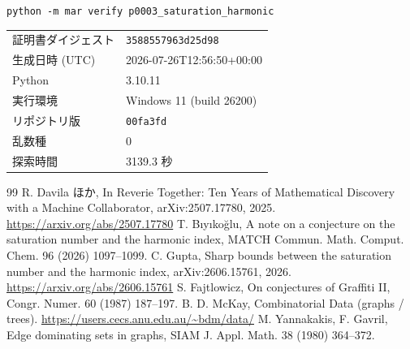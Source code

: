 \documentclass[paper=a4,fontsize=10.5pt,jafontsize=10.5pt]{jlreq}
\theoremstyle{plain}
\theoremstyle{definition}
\begin{document}
\begin{center}\texttt{python -m mar verify p0003\_saturation\_harmonic}\end{center}

\begin{center}\begin{tabular}{ll}\toprule
証明書ダイジェスト & \texttt{3588557963d25d98} \\
生成日時 (UTC) & 2026-07-26T12:56:50+00:00 \\
Python & 3.10.11 \\
実行環境 & Windows 11 (build 26200) \\
リポジトリ版 & \texttt{00fa3fd} \\
乱数種 & 0 \\
探索時間 & 3139.3 秒 \\
\bottomrule\end{tabular}\end{center}


\begin{thebibliography}{99}
 R. Davila ほか, In Reverie Together: Ten Years of Mathematical Discovery with a Machine Collaborator, arXiv:2507.17780, 2025. \url{https://arxiv.org/abs/2507.17780}
 T. Bıyıkoğlu, A note on a conjecture on the saturation number and the harmonic index, MATCH Commun. Math. Comput. Chem. 96 (2026) 1097--1099.
 C. Gupta, Sharp bounds between the saturation number and the harmonic index, arXiv:2606.15761, 2026. \url{https://arxiv.org/abs/2606.15761}
 S. Fajtlowicz, On conjectures of Graffiti II, Congr. Numer. 60 (1987) 187--197.
 B. D. McKay, Combinatorial Data (graphs / trees). \url{https://users.cecs.anu.edu.au/~bdm/data/}
 M. Yannakakis, F. Gavril, Edge dominating sets in graphs, SIAM J. Appl. Math. 38 (1980) 364--372.
\end{thebibliography}
\end{document}

